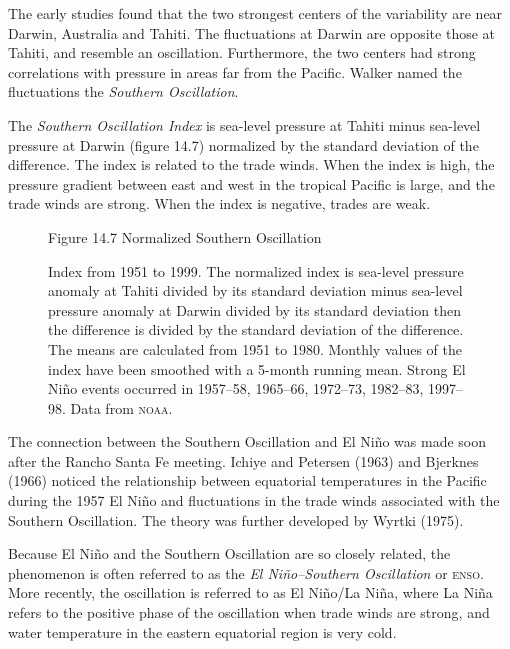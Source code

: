 The early studies found that the two strongest centers of the
variability are near Darwin, Australia and Tahiti. The fluctuations at
Darwin are opposite those at Tahiti, and resemble an
oscillation. Furthermore, the two centers had strong correlations with
pressure in areas far from the Pacific. Walker named the fluctuations
the \textit{Southern Oscillation}.

The \textit{Southern Oscillation Index} is sea-level pressure at Tahiti minus
sea-level pressure at Darwin (figure 14.7) normalized by the standard
deviation of the difference. The index is related to the trade
winds. When the index is high, the pressure gradient between east and
west in the tropical Pacific is large, and the trade winds are
strong. When the index is negative, trades are weak.

\begin{figure}[t!]
\footnotesize
Figure 14.7 Normalized Southern Oscillation \rule{0pt}{3ex}Index from
1951 to 1999. The normalized index is sea-level pressure anomaly at
Tahiti divided by its standard deviation minus sea-level pressure
anomaly at Darwin divided by its standard deviation then the
difference is divided by the standard deviation of the difference. The
means are calculated from 1951 to 1980. Monthly values of the index
have been smoothed with a 5-month running mean. Strong El Ni\~{n}o
events occurred in 1957--58, 1965--66, 1972--73, 1982--83,
1997--98. Data from \textsc{noaa}.
\label{fig:soi}
\vspace{-3ex}
\end{figure}

The connection between the Southern Oscillation and El Ni\~{n}o was made soon after the Rancho Santa Fe
meeting. Ichiye and Petersen (1963) and Bjerknes (1966) noticed the
relationship between equatorial temperatures in the Pacific during the
1957 El Ni\~{n}o and fluctuations in the trade winds associated with
the Southern Oscillation. The theory was further developed by Wyrtki
(1975).

Because El Ni\~{n}o and the Southern Oscillation are so closely related, the phenomenon is often
referred to as the \textit{El Ni\~{n}o--Southern
  Oscillation} or \textsc{enso}. More recently, the
oscillation is referred to as El Ni\~{n}o/La Ni\~{n}a, where La
Ni\~{n}a refers to the positive phase of the oscillation when trade
winds are strong, and water temperature in the eastern equatorial
region is very cold.

